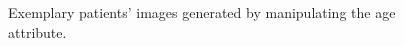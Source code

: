 \documentclass[runningheads]{llncs}
\begin{document}
\begin{figure}[t]
\caption{Exemplary patients' images generated by manipulating the age attribute.}
\label{Fig:IndividualImportanceFeature}
\end{figure}

\end{document}
